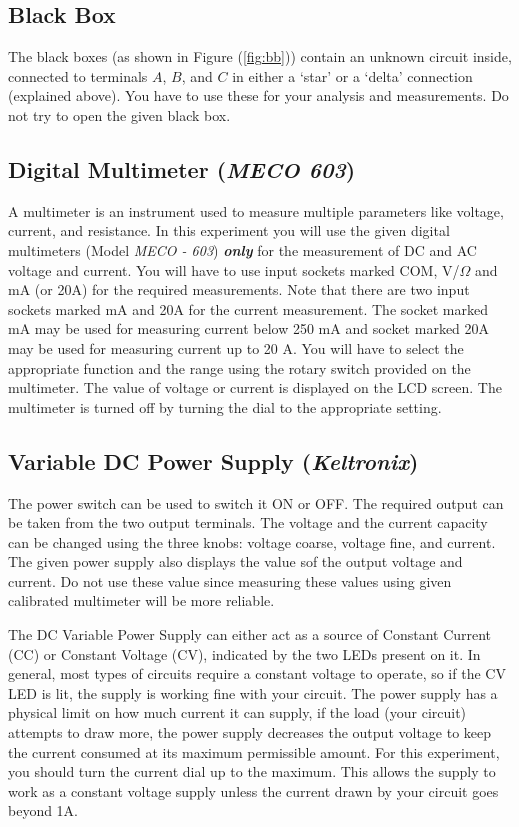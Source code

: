 \subsection*{Black Box}
The black boxes (as shown in Figure (\ref{fig:bb})) contain an unknown circuit inside, connected to terminals $A$, $B$, and $C$ in either a `star' or a `delta' connection (explained above). You have to use these for your analysis and measurements. Do not try to open the given black box.

\subsection*{Digital Multimeter (\textit{MECO 603})}

A multimeter is an instrument used to measure multiple parameters like voltage, current, and resistance. In this experiment you will use the given digital multimeters (Model \textit{MECO - 603}) \textbf{\textit{only}} for the measurement of DC and AC voltage and current. You will have to use input sockets marked COM, V/$\Omega$ and mA (or 20A) for the required measurements. Note that there are two input sockets marked mA and 20A for the current measurement. The socket marked mA may be used for measuring current below 250 mA and socket marked 20A may be used for measuring current up to 20 A. You will have to select the appropriate function and the range using the rotary switch provided on the multimeter. The value of voltage or current is displayed on the LCD screen. The multimeter is turned off by turning the dial to the appropriate setting.

\subsection*{Variable DC Power Supply (\textit{Keltronix})}

The power switch can be used to switch it ON or OFF. The required output can be taken from the two output terminals. The voltage and the current capacity can be changed using the three knobs: voltage coarse, voltage fine, and current. The given power supply also displays the value sof the output voltage and current. Do not use these value since measuring these values using given calibrated multimeter will be more reliable. 

The DC Variable Power Supply can either act as a source of Constant Current (CC) or Constant Voltage (CV), indicated by the two LEDs present on it. In general, most types of circuits require a constant voltage to operate, so if the CV LED is lit, the supply is working fine with your circuit. The power supply has a physical limit on how much current it can supply, if the load (your circuit) attempts to draw more, the power supply decreases the output voltage to keep the current consumed at its maximum permissible amount. For this experiment, you should turn the current dial up to the maximum. This allows the supply to work as a constant voltage supply unless the current drawn by your circuit goes beyond 1A.

